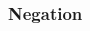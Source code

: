 \vspace{-10pt}
\hrulefill
\vspace{-10pt}
%
%
%
%
%
\begin{multicols}{2}
\subsubsection*{Negation}

\begin{pf}
\open
	\ellipsesline
	\ellipsesline
\close
{}
\end{pf}
\columnbreak

\begin{pf}
\open
	\ellipsesline
	\ellipsesline
\close
{}
\end{pf}



\end{multicols} %

